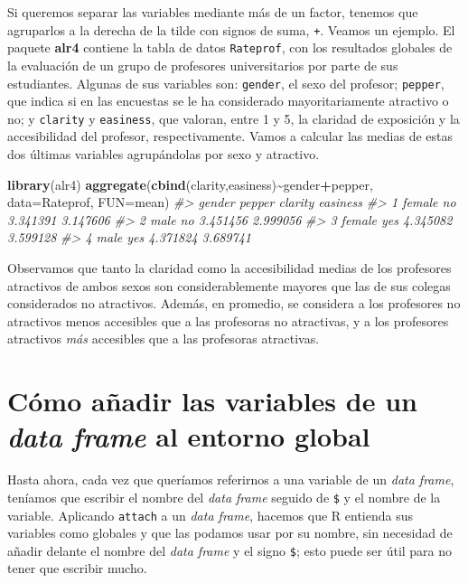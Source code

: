 \documentclass[
]{book}
\newenvironment{Shaded}{\begin{snugshade}}{\end{snugshade}}
\newcommand{\CommentTok}[1]{\textcolor[rgb]{0.56,0.35,0.01}{\textit{#1}}}
\newcommand{\DataTypeTok}[1]{\textcolor[rgb]{0.13,0.29,0.53}{#1}}
\newcommand{\KeywordTok}[1]{\textcolor[rgb]{0.13,0.29,0.53}{\textbf{#1}}}
\newcommand{\NormalTok}[1]{#1}
\newcommand{\OperatorTok}[1]{\textcolor[rgb]{0.81,0.36,0.00}{\textbf{#1}}}
\theoremstyle{definition}
\theoremstyle{definition}
\theoremstyle{definition}
\theoremstyle{remark}
\begin{document}
Si queremos separar las variables mediante más de un factor, tenemos que agruparlos a la derecha de la tilde con signos de suma, \texttt{+}. Veamos un ejemplo. El paquete \textbf{alr4} contiene la tabla de datos \texttt{Rateprof}, con los resultados globales de la evaluación de un grupo de profesores universitarios por parte de sus estudiantes. Algunas de sus variables son: \texttt{gender}, el sexo del profesor; \texttt{pepper}, que indica si en las encuestas se le ha considerado mayoritariamente atractivo o no; y \texttt{clarity} y \texttt{easiness}, que valoran, entre 1 y 5, la claridad de exposición y la accesibilidad del profesor, respectivamente. Vamos a calcular las medias de estas dos últimas variables agrupándolas por sexo y atractivo.

\begin{Shaded}
\begin{Highlighting}[]
\KeywordTok{library}\NormalTok{(alr4)}
\KeywordTok{aggregate}\NormalTok{(}\KeywordTok{cbind}\NormalTok{(clarity,easiness)}\OperatorTok{\textasciitilde{}}\NormalTok{gender}\OperatorTok{+}\NormalTok{pepper, }\DataTypeTok{data=}\NormalTok{Rateprof, }\DataTypeTok{FUN=}\NormalTok{mean)}
\CommentTok{\#\textgreater{}   gender pepper  clarity easiness}
\CommentTok{\#\textgreater{} 1 female     no 3.341391 3.147606}
\CommentTok{\#\textgreater{} 2   male     no 3.451456 2.999056}
\CommentTok{\#\textgreater{} 3 female    yes 4.345082 3.599128}
\CommentTok{\#\textgreater{} 4   male    yes 4.371824 3.689741}
\end{Highlighting}
\end{Shaded}

Observamos que tanto la claridad como la accesibilidad medias de los profesores atractivos de ambos sexos son considerablemente mayores que las de sus colegas considerados no atractivos. Además, en promedio, se considera a los profesores no atractivos menos accesibles que a las profesoras no atractivas, y a los profesores atractivos \emph{más} accesibles que a las profesoras atractivas.

\hypertarget{sub:attach}{%
\section{\texorpdfstring{Cómo añadir las variables de un \emph{data frame} al entorno global}{Cómo añadir las variables de un data frame al entorno global}}\label{sub:attach}}

Hasta ahora, cada vez que queríamos referirnos a una variable de un \emph{data frame}, teníamos que escribir el nombre del \emph{data frame} seguido de \texttt{\$} y el nombre de la variable. Aplicando \texttt{attach} a un \emph{data frame}, hacemos que R entienda sus variables como globales y que las podamos usar por su nombre, sin necesidad de añadir delante el nombre del \emph{data frame} y el signo \texttt{\$}; esto puede ser útil para no tener que escribir mucho.
\end{document}

